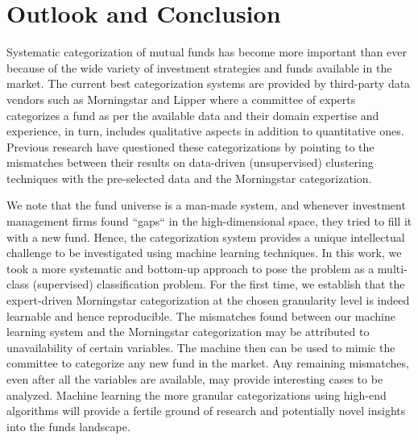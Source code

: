 \documentclass[sigconf]{acmart}
\begin{document}


\section{Outlook and Conclusion}
Systematic categorization of mutual funds has become more important than ever because of the wide variety of investment strategies and funds available in the market. The current best categorization systems are provided by third-party data vendors such as Morningstar and Lipper where a committee of experts categorizes a fund as per the available data and their domain expertise and experience, in turn, includes qualitative aspects in addition to quantitative ones. Previous research have questioned these categorizations by pointing to the mismatches between their results on data-driven (unsupervised) clustering techniques with the pre-selected data and the Morningstar categorization.


We note that the fund universe is a man-made system, and whenever investment management firms found ``gaps`` in the high-dimensional space, they tried to fill it with a new fund. Hence, the categorization system provides a unique intellectual challenge to be investigated using machine learning techniques. In this work, we took a more systematic and bottom-up approach to pose the problem as a multi-class (supervised) classification problem. For the first time, we establish that the expert-driven Morningstar categorization at the chosen granularity level is indeed learnable and hence reproducible. The mismatches found between our machine learning system and the Morningstar categorization may be attributed to unavailability of certain variables. The machine then can be used to mimic the committee to categorize any new fund in the market. Any remaining mismatches, even after all the variables are available, may provide interesting cases to be analyzed. Machine learning the more granular categorizations using high-end algorithms will provide a fertile ground of research and potentially novel insights into the funds landscape.
\end{document}
